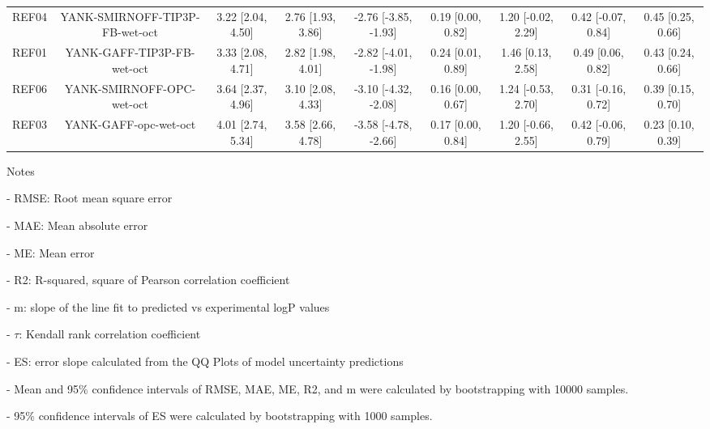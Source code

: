 \documentclass{article}
\begin{document}
\begin{center}
\begin{longtable}{|ccccccccc|}
 REF04 &  YANK-SMIRNOFF-TIP3P-FB-wet-oct &  3.22 [2.04, 4.50] &  2.76 [1.93, 3.86] &  -2.76 [-3.85, -1.93] &  0.19 [0.00, 0.82] &  1.20 [-0.02, 2.29] &  0.42 [-0.07, 0.84] &    0.45 [0.25, 0.66] \\
 REF01 &      YANK-GAFF-TIP3P-FB-wet-oct &  3.33 [2.08, 4.71] &  2.82 [1.98, 4.01] &  -2.82 [-4.01, -1.98] &  0.24 [0.01, 0.89] &   1.46 [0.13, 2.58] &   0.49 [0.06, 0.82] &    0.43 [0.24, 0.66] \\
 REF06 &       YANK-SMIRNOFF-OPC-wet-oct &  3.64 [2.37, 4.96] &  3.10 [2.08, 4.33] &  -3.10 [-4.32, -2.08] &  0.16 [0.00, 0.67] &  1.24 [-0.53, 2.70] &  0.31 [-0.16, 0.72] &    0.39 [0.15, 0.70] \\
 REF03 &           YANK-GAFF-opc-wet-oct &  4.01 [2.74, 5.34] &  3.58 [2.66, 4.78] &  -3.58 [-4.78, -2.66] &  0.17 [0.00, 0.84] &  1.20 [-0.66, 2.55] &  0.42 [-0.06, 0.79] &    0.23 [0.10, 0.39] \\
\end{longtable}
\end{center}

Notes

- RMSE: Root mean square error

- MAE: Mean absolute error

- ME: Mean error

- R2: R-squared, square of Pearson correlation coefficient

- m: slope of the line fit to predicted vs experimental logP values

- $\tau$:  Kendall rank correlation coefficient

- ES: error slope calculated from the QQ Plots of model uncertainty predictions

- Mean and 95\% confidence intervals of RMSE, MAE, ME, R2, and m were calculated by bootstrapping with 10000 samples.

- 95\% confidence intervals of ES were calculated by bootstrapping with 1000 samples.\end{document}
\end{document}
